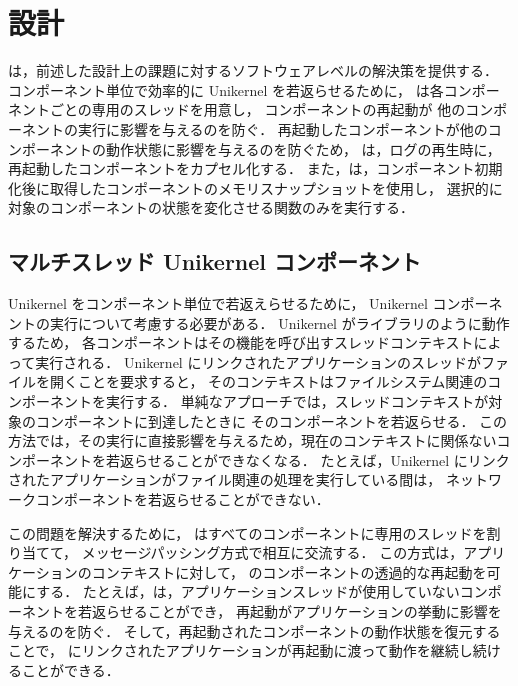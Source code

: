 \section{設計} \label{sec:design}

\sysname は，前述した設計上の課題に対するソフトウェアレベルの解決策を提供する．
コンポーネント単位で効率的に Unikernel を若返らせるために，
\sysname は各コンポーネントごとの専用のスレッドを用意し，
コンポーネントの再起動が
他のコンポーネントの実行に影響を与えるのを防ぐ．
再起動したコンポーネントが他のコンポーネントの動作状態に影響を与えるのを防ぐため，
\sysname は，ログの再生時に，再起動したコンポーネントをカプセル化する．
また，\sysname は，コンポーネント初期化後に取得したコンポーネントのメモリスナップショットを使用し，
選択的に対象のコンポーネントの状態を変化させる関数のみを実行する．


\subsection{マルチスレッド Unikernel コンポーネント}

Unikernel をコンポーネント単位で若返えらせるために，
Unikernel コンポーネントの実行について考慮する必要がある．
Unikernel がライブラリのように動作するため，
各コンポーネントはその機能を呼び出すスレッドコンテキストによって実行される．
Unikernel にリンクされたアプリケーションのスレッドがファイルを開くことを要求すると，
そのコンテキストはファイルシステム関連のコンポーネントを実行する．
単純なアプローチでは，スレッドコンテキストが対象のコンポーネントに到達したときに
そのコンポーネントを若返らせる．
この方法では，その実行に直接影響を与えるため，現在のコンテキストに関係ないコンポーネントを若返らせることができなくなる．
たとえば，Unikernel にリンクされたアプリケーションがファイル関連の処理を実行している間は，
ネットワークコンポーネントを若返らせることができない．

この問題を解決するために，
\sysname はすべてのコンポーネントに専用のスレッドを割り当てて，
メッセージパッシング方式で相互に交流する．
この方式は，アプリケーションのコンテキストに対して， \sysname のコンポーネントの透過的な再起動を可能にする．
たとえば，\sysname は，アプリケーションスレッドが使用していないコンポーネントを若返らせることができ，
再起動がアプリケーションの挙動に影響を与えるのを防ぐ．
そして，再起動されたコンポーネントの動作状態を復元することで，
\sysname にリンクされたアプリケーションが再起動に渡って動作を継続し続けることができる．

